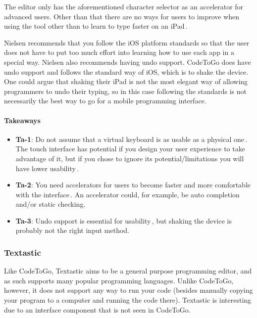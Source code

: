 The editor only has the aforementioned character selector as an accelerator for advanced users. Other than that there are no ways for users to improve when using the tool other than to learn to type faster on an iPad\,\cite{nielsen1990heuristic}.

Nielsen recommends that you follow the iOS platform standards so that the user does not have to put too much effort into learning how to use each app in a special way. Nielsen also recommends having undo support. CodeToGo does have undo support and follows the standard way of iOS, which is to shake the device. One could argue that shaking their iPad is not the most elegant way of allowing programmers to undo their typing, so in this case following the standards is not necessarily the best way to go for a mobile programming interface.

\paragraph{Takeaways}
\begin{itemize}
	\item \textbf{Ta-1}: Do not assume that a virtual keyboard is as usable as a physical one\,\cite{nielsen2013mobile}. The touch interface has potential if you design your user experience to take advantage of it, but if you chose to ignore its potential/limitations you will have lower usability\,\cite{nielsen1990heuristic}.
	\item \textbf{Ta-2}: You need accelerators for users to become faster and more comfortable with the interface\,\cite{nielsen1990heuristic}. An accelerator could, for example, be auto completion and/or static checking.
	\item \textbf{Ta-3}: Undo support is essential for usability\,\cite{nielsen1990heuristic}, but shaking the device is probably not the right input method.
\end{itemize}

\subsubsection{Textastic}
\label{subsub:Textastic}
Like CodeToGo, Textastic aims to be a general purpose programming editor, and as such supports many popular programming languages. Unlike CodeToGo, however, it does not support any way to run your code (besides manually copying your program to a computer and running the code there). Textastic is interesting due to an interface component that is not seen in CodeToGo.

